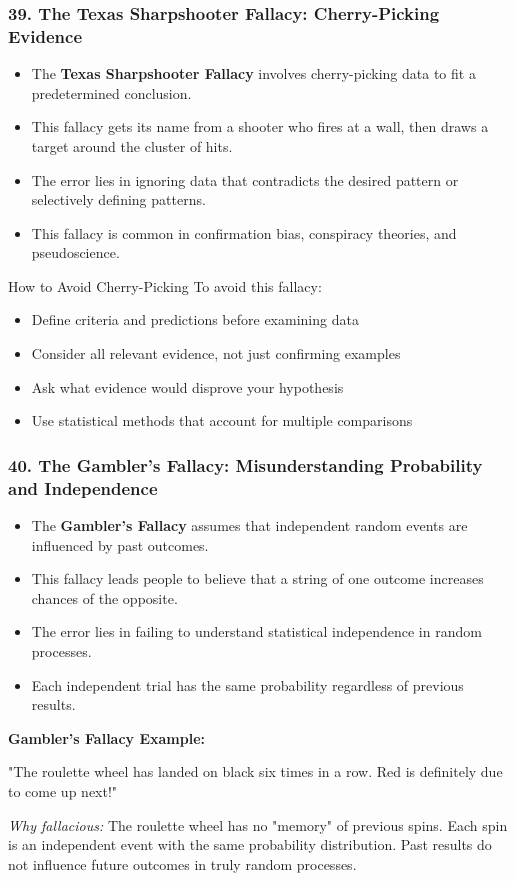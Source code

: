\documentclass{beamer}
\begin{document}
    \begin{frame}
    \frametitle{39. The Texas Sharpshooter Fallacy: Cherry-Picking Evidence}
    \begin{itemize}
        \item The \textbf{Texas Sharpshooter Fallacy} involves cherry-picking data to fit a predetermined conclusion.
        \item This fallacy gets its name from a shooter who fires at a wall, then draws a target around the cluster of hits.
        \item The error lies in ignoring data that contradicts the desired pattern or selectively defining patterns.
        \item This fallacy is common in confirmation bias, conspiracy theories, and pseudoscience.
    \end{itemize}
    
    \begin{block}{How to Avoid Cherry-Picking}
        To avoid this fallacy:
        \begin{itemize}
            \item Define criteria and predictions before examining data
            \item Consider all relevant evidence, not just confirming examples
            \item Ask what evidence would disprove your hypothesis
            \item Use statistical methods that account for multiple comparisons
        \end{itemize}
    \end{block}
    \end{frame}
    
    \begin{frame}
    \frametitle{40. The Gambler's Fallacy: Misunderstanding Probability and Independence}
    \begin{itemize}
        \item The \textbf{Gambler's Fallacy} assumes that independent random events are influenced by past outcomes.
        \item This fallacy leads people to believe that a string of one outcome increases chances of the opposite.
        \item The error lies in failing to understand statistical independence in random processes.
        \item Each independent trial has the same probability regardless of previous results.
    \end{itemize}
    
    \begin{example}
    \textbf{Gambler's Fallacy Example:}
    
    "The roulette wheel has landed on black six times in a row. Red is definitely due to come up next!"
    
    \textit{Why fallacious:} The roulette wheel has no "memory" of previous spins. Each spin is an independent event with the same probability distribution. Past results do not influence future outcomes in truly random processes.
    \end{example}
    \end{frame}
\end{document}
